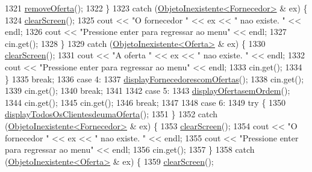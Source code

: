 \begin{DoxyCode}
1321                 \hyperlink{classEmpresa_a5b5c42d733ccee37f932db5db8aec243}{removeOferta}();
1322             \}
1323             \textcolor{keywordflow}{catch} (\hyperlink{classObjetoInexistente}{ObjetoInexistente<Fornecedor>} & ex) \{
1324                 \hyperlink{menu_8h_aceb70c1ed7e11f0863a868704f02214b}{clearScreen}();
1325                 cout << \textcolor{stringliteral}{"O fornecedor "} << ex << \textcolor{stringliteral}{" nao existe. "} << endl;
1326                 cout << \textcolor{stringliteral}{"Pressione enter para regressar ao menu"} << endl;
1327                 cin.get();
1328             \}
1329             \textcolor{keywordflow}{catch} (\hyperlink{classObjetoInexistente}{ObjetoInexistente<Oferta>} & ex) \{
1330                 \hyperlink{menu_8h_aceb70c1ed7e11f0863a868704f02214b}{clearScreen}();
1331                 cout << \textcolor{stringliteral}{"A oferta "} << ex << \textcolor{stringliteral}{" nao existe. "} << endl;
1332                 cout << \textcolor{stringliteral}{"Pressione enter para regressar ao menu"} << endl;
1333                 cin.get();
1334             \}
1335             \textcolor{keywordflow}{break};
1336         \textcolor{keywordflow}{case} 4:
1337             \hyperlink{classEmpresa_aa47e9a64800a41180b7f374b73a1f32b}{displayFornecedorescomOfertas}();
1338             cin.get();
1339             cin.get();
1340             \textcolor{keywordflow}{break};
1341 
1342         \textcolor{keywordflow}{case} 5:
1343             \hyperlink{classEmpresa_acd458614a3cca3f432b54212a2e72584}{displayOfertasemOrdem}();
1344             cin.get();
1345             cin.get();
1346             \textcolor{keywordflow}{break};
1347 
1348         \textcolor{keywordflow}{case} 6:
1349             \textcolor{keywordflow}{try} \{
1350                 \hyperlink{classEmpresa_a641c2eb827b39ab79919187645ff71a9}{displayTodosOsClientesdeumaOferta}();
1351             \}
1352             \textcolor{keywordflow}{catch} (\hyperlink{classObjetoInexistente}{ObjetoInexistente<Fornecedor>} & ex) \{
1353                 \hyperlink{menu_8h_aceb70c1ed7e11f0863a868704f02214b}{clearScreen}();
1354                 cout << \textcolor{stringliteral}{"O fornecedor "} << ex << \textcolor{stringliteral}{" nao existe. "} << endl;
1355                 cout << \textcolor{stringliteral}{"Pressione enter para regressar ao menu"} << endl;
1356                 cin.get();
1357             \}
1358             \textcolor{keywordflow}{catch} (\hyperlink{classObjetoInexistente}{ObjetoInexistente<Oferta>} & ex) \{
1359                 \hyperlink{menu_8h_aceb70c1ed7e11f0863a868704f02214b}{clearScreen}();

\end{DoxyCode}
